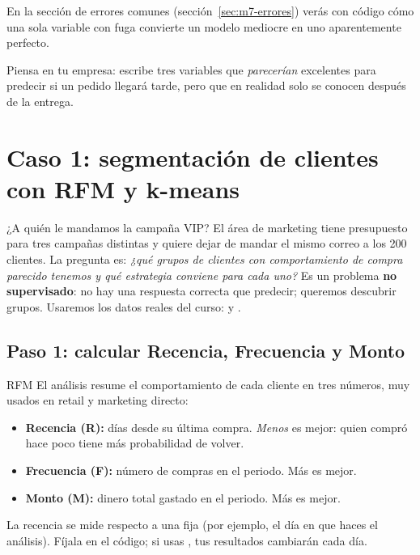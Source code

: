 En la sección de errores comunes (sección~\ref{sec:m7-errores}) verás con
código cómo una sola variable con fuga convierte un modelo mediocre en uno
aparentemente perfecto.

\begin{hazlotu}
Piensa en tu empresa: escribe tres variables que \emph{parecerían} excelentes
para predecir si un pedido llegará tarde, pero que en realidad solo se conocen
después de la entrega.
\end{hazlotu}

\section{Caso 1: segmentación de clientes con RFM y k-means}
\label{sec:m7-segmentacion}

\begin{ejemplo}{¿A quién le mandamos la campaña VIP?}
El área de marketing tiene presupuesto para tres campañas distintas y quiere
dejar de mandar el mismo correo a los 200 clientes. La pregunta es: \emph{¿qué
grupos de clientes con comportamiento de compra parecido tenemos y qué
estrategia conviene para cada uno?} Es un problema \textbf{no supervisado}: no
hay una respuesta correcta que predecir; queremos descubrir grupos. Usaremos
los datos reales del curso:  y
.
\end{ejemplo}

\subsection{Paso 1: calcular Recencia, Frecuencia y Monto}

\begin{concepto}{RFM}
El análisis  resume el comportamiento de cada cliente en tres
números, muy usados en retail y marketing directo:
\begin{itemize}
  \item \textbf{Recencia (R):} días desde su última compra. \emph{Menos} es
        mejor: quien compró hace poco tiene más probabilidad de volver.
  \item \textbf{Frecuencia (F):} número de compras en el periodo. Más es mejor.
  \item \textbf{Monto (M):} dinero total gastado en el periodo. Más es mejor.
\end{itemize}
La recencia se mide respecto a una  fija (por ejemplo,
el día en que haces el análisis). Fíjala en el código; si usas
, tus resultados cambiarán cada día.
\end{concepto}

